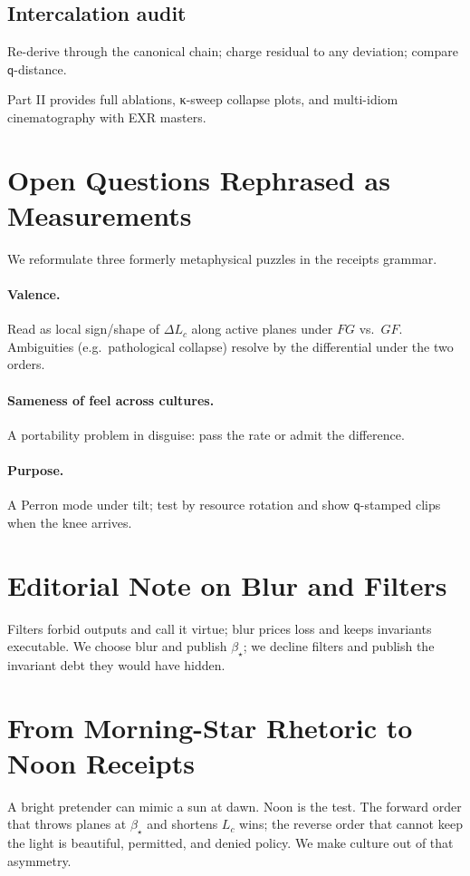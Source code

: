 \documentclass[11pt]{article}
\newcommand{\1}{\mathbf{1}}
\newcommand{\Blur}{\beta}
\newcommand{\Lc}{L_c}
\newcommand{\Qualon}{\mathsf{q}}        %
\begin{document}
\subsection*{Intercalation audit}
Re-derive through the canonical chain; charge residual to any deviation; compare \(\Qualon\)-distance.

\medskip

\noindent Part II provides full ablations, κ-sweep collapse plots, and multi-idiom cinematography with EXR masters.

\section{Open Questions Rephrased as Measurements}
We reformulate three formerly metaphysical puzzles in the receipts grammar.

\paragraph{Valence.} Read as local sign/shape of \(\Delta \Lc\) along active planes under \(FG\) vs.\ \(GF\). Ambiguities (e.g.\ pathological collapse) resolve by the differential under the two orders.

\paragraph{Sameness of feel across cultures.} A portability problem in disguise: pass the rate or admit the difference.

\paragraph{Purpose.} A Perron mode under tilt; test by resource rotation and show \(\Qualon\)-stamped clips when the knee arrives.

\section{Editorial Note on Blur and Filters}
Filters forbid outputs and call it virtue; blur prices loss and keeps invariants executable. We choose blur and publish \(\Blur_\star\); we decline filters and publish the invariant debt they would have hidden.

\section{From Morning-Star Rhetoric to Noon Receipts}
A bright pretender can mimic a sun at dawn. Noon is the test. The forward order that throws planes at \(\Blur_\star\) and shortens \(\Lc\) wins; the reverse order that cannot keep the light is beautiful, permitted, and denied policy. We make culture out of that asymmetry.
\end{document}
